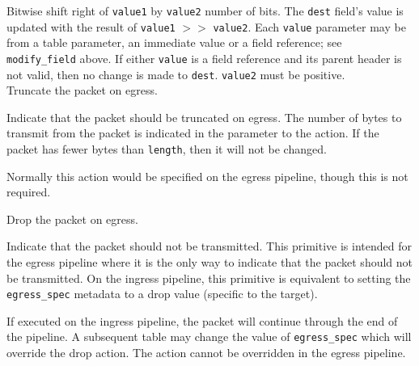 \documentclass[12pt]{article}
\begin{document}

{ %
\color{red}Bitwise shift right of \texttt{value1} by \texttt{value2} number of bits.
}
{ %
}
{ %
\color{red}
The \texttt{dest} field's value is updated with the result of 
\texttt{value1} $>>$ \texttt{value2}. Each \texttt{value} parameter may be from a
table parameter, an immediate value or a field reference; see \texttt{modify_field} above. If either \texttt{value}
is a field reference and its parent header is not valid, then no
change is made to \texttt{dest}. \texttt{value2} must be positive. 
}\\


{ %
Truncate the packet on egress.
}
{ %
}
{ %
Indicate that the packet should be truncated on egress.  The number of bytes 
to transmit from the packet is indicated in the parameter to the action.  If 
the packet has fewer bytes than \texttt{length}, then it will not be changed.

Normally this action would be specified on the egress pipeline, though this 
is not required.
}


{ %
Drop the packet on egress.
}
{ %
}
{ %
Indicate that the packet should not be transmitted. This primitive is intended 
for the egress pipeline where it is the only way to indicate that the packet 
should not be transmitted. On the ingress pipeline, this primitive is equivalent 
to setting the \texttt{egress_spec} metadata to a drop value (specific to the target). 


If executed on the ingress pipeline, the packet will continue through the 
end of the pipeline. A subsequent table may change the value of \texttt{egress_spec} which 
will override the drop action. The action cannot be overridden in the egress 
pipeline.
}

\end{document}
